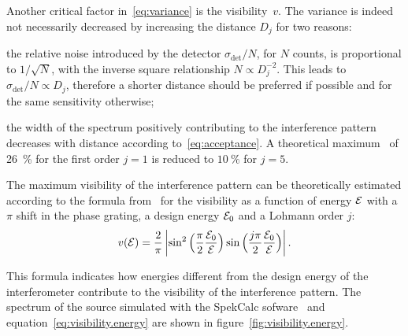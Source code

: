 Another critical factor in~\eqref{eq:variance} is the visibility~$v$. The
variance is indeed not necessarily decreased by increasing the distance
$D_j$ for two reasons:
\begin{aenumerate}
    \item the relative noise introduced by the detector
        $\sigma_{\text{det}}/N$, for
        $N$ counts, is proportional to $1 / \sqrt{N}$, with the inverse
        square relationship $N \propto
        D_j^{-2}$. This leads to $\sigma_{\text{det}}/N \propto D_j$,
        therefore a shorter distance should be preferred if possible and for
        the same sensitivity otherwise;
    \item the width of the spectrum positively contributing to the
        interference pattern decreases with distance according
        to~\eqref{eq:acceptance}. A theoretical
        maximum~\parencite{Thuering20130027} of
        \SI{26}{\percent} for the first order $j = 1$ is reduced to
        $\SI{10}{\percent}$ for $j = 5$.
\end{aenumerate}
The maximum visibility of the interference pattern can be theoretically
estimated according to the formula from~\cite{Thuering20130027} for the visibility as a function
of energy $\mathcal{E}$ with a $\pi$ shift in the phase grating, a design energy
$\mathcal{E}_0$ and a Lohmann order $j$:
\begin{equation}
            v(\mathcal{E}) = \frac{2}{\pi} \left\lvert \sin^2
            \Big(\frac{\pi}{2}\frac{\mathcal{E}_0}{\mathcal{E}}\Big) 
            \sin
            \Big(\frac{j\pi}{2}\frac{\mathcal{E}_0}{\mathcal{E}}\Big) 
            \right\rvert.
    \label{eq:visibility.energy}
\end{equation}

This formula indicates how energies different from the design energy of the
interferometer contribute to the visibility of the interference pattern. The
spectrum of the source simulated with the SpekCalc sofware~\parencite{spekcalc}
and equation~\eqref{eq:visibility.energy} are shown in
figure~\ref{fig:visibility.energy}.

